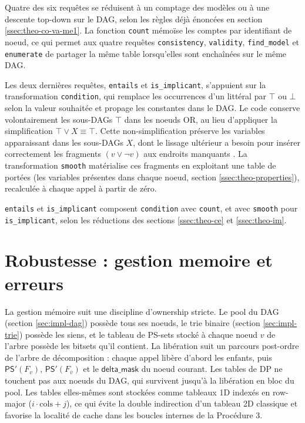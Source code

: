 \documentclass[11pt,a4paper]{report}
\theoremstyle{plain}
\theoremstyle{definition}
\begin{document}
Quatre des six requêtes se réduisent à un comptage des modèles ou à
une descente top-down sur le DAG, selon les règles déjà énoncées en
section \ref{ssec:theo-co-va-me1}. La fonction \texttt{count} mémoïse
les comptes par identifiant de noeud, ce qui permet aux quatre
requêtes \texttt{consistency}, \texttt{validity}, \texttt{find\_model}
et \texttt{enumerate} de partager la même table lorsqu'elles sont
enchaînées sur le même DAG.

Les deux dernières requêtes, \texttt{entails} et \texttt{is\_implicant},
s'appuient sur la transformation \texttt{condition}, qui remplace les
occurrences d'un littéral par $\top$ ou $\bot$ selon la valeur souhaitée
et propage les constantes dans le DAG. Le code conserve volontairement
les sous-DAGs $\top$ dans les noeuds OR, au lieu d'appliquer la
simplification $\top \vee X \equiv \top$. Cette non-simplification
préserve les variables apparaissant dans les sous-DAGs $X$, dont le
lissage ultérieur a besoin pour insérer correctement les fragments
$(v \vee \neg v)$ aux endroits manquants \cite{darwiche2002}. La
transformation \texttt{smooth} matérialise ces fragments en exploitant
une table de portées (les variables présentes dans chaque noeud,
section \ref{ssec:theo-properties}), recalculée à chaque appel à
partir de zéro.

\texttt{entails} et \texttt{is\_implicant} composent \texttt{condition}
avec \texttt{count}, et avec \texttt{smooth} pour
\texttt{is\_implicant}, selon les réductions des
sections \ref{ssec:theo-ce} et \ref{ssec:theo-im}.

\section{Robustesse : gestion memoire et erreurs}
\label{sec:impl-robustness}

La gestion mémoire suit une discipline d'ownership stricte. Le pool
du DAG (section \ref{sec:impl-dag}) possède tous ses noeuds, le trie
binaire (section \ref{sec:impl-trie}) possède les siens, et le
tableau de PS-sets stocké à chaque noeud $v$ de l'arbre possède les
bitsets qu'il contient. La libération suit un parcours post-ordre de
l'arbre de décomposition : chaque appel libère d'abord les enfants,
puis $\mathsf{PS}'(F_v)$, $\mathsf{PS}'(F_{\overline{v}})$ et le
$\mathsf{delta\_mask}$ du noeud courant. Les tables de DP ne
touchent pas aux noeuds du DAG, qui survivent jusqu'à la libération
en bloc du pool. Les tables elles-mêmes sont stockées comme tableaux
1D indexés en row-major ($i \cdot \mathrm{cols} + j$), ce qui évite
la double indirection d'un tableau 2D classique et favorise la
localité de cache dans les boucles internes de la Procédure 3.
\end{document}
